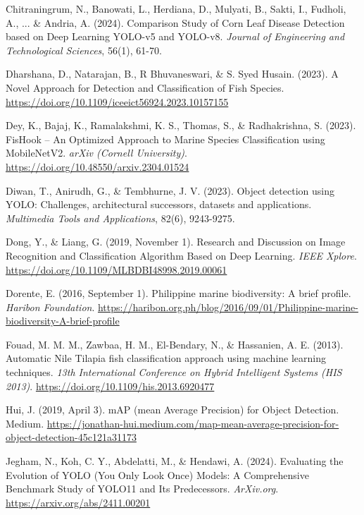 \begin{bibliography}
 Chitraningrum, N., Banowati, L., Herdiana, D., Mulyati, B., Sakti, I., Fudholi, A., ... \& Andria, A. (2024). Comparison Study of Corn Leaf Disease Detection based on Deep Learning YOLO-v5 and YOLO-v8. \textit{Journal of Engineering and Technological Sciences}, 56(1), 61-70.

 Dharshana, D., Natarajan, B., R Bhuvaneswari, \& S. Syed Husain. (2023). A Novel Approach for Detection and Classification of Fish Species. \url{https://doi.org/10.1109/iceeict56924.2023.10157155}

 Dey, K., Bajaj, K., Ramalakshmi, K. S., Thomas, S., \& Radhakrishna, S. (2023). FisHook -- An Optimized Approach to Marine Species Classification using MobileNetV2. \textit{arXiv (Cornell University)}. \url{https://doi.org/10.48550/arxiv.2304.01524}

 Diwan, T., Anirudh, G., \& Tembhurne, J. V. (2023). Object detection using YOLO: Challenges, architectural successors, datasets and applications. \textit{Multimedia Tools and Applications}, 82(6), 9243-9275.

 Dong, Y., \& Liang, G. (2019, November 1). Research and Discussion on Image Recognition and Classification Algorithm Based on Deep Learning. \textit{IEEE Xplore}. \url{https://doi.org/10.1109/MLBDBI48998.2019.00061}

 Dorente, E. (2016, September 1). Philippine marine biodiversity: A brief profile. \textit{Haribon Foundation}. \url{https://haribon.org.ph/blog/2016/09/01/Philippine-marine-biodiversity-A-brief-profile}

 Fouad, M. M. M., Zawbaa, H. M., El-Bendary, N., \& Hassanien, A. E. (2013). Automatic Nile Tilapia fish classification approach using machine learning techniques. \textit{13th International Conference on Hybrid Intelligent Systems (HIS 2013)}. \url{https://doi.org/10.1109/his.2013.6920477}

 Hui, J. (2019, April 3). mAP (mean Average Precision) for Object Detection. Medium. \url{https://jonathan-hui.medium.com/map-mean-average-precision-for-object-detection-45c121a31173}

 Jegham, N., Koh, C. Y., Abdelatti, M., \& Hendawi, A. (2024). Evaluating the Evolution of YOLO (You Only Look Once) Models: A Comprehensive Benchmark Study of YOLO11 and Its Predecessors. \textit{ArXiv.org}. \url{https://arxiv.org/abs/2411.00201}


\end{bibliography}
